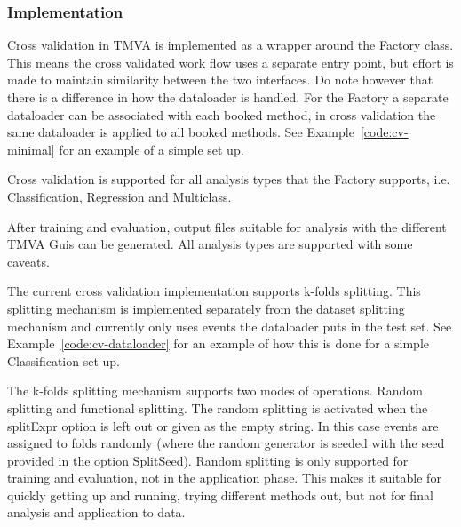 \subsubsection{Implementation}



Cross validation in TMVA is implemented as a wrapper around the Factory class. This means the cross validated work flow uses a separate entry point, but effort is made to maintain similarity between the two interfaces. Do note however that there is a difference in how the dataloader is handled. For the Factory a separate dataloader can be associated with each booked method, in cross validation the same dataloader is applied to all booked methods. See Example~\ref{code:cv-minimal} for an example of a simple set up.

Cross validation is supported for all analysis types that the Factory supports, i.e. Classification, Regression and Multiclass.

After training and evaluation, output files suitable for analysis with the different TMVA Guis can be generated. All analysis types are supported with some caveats.

The current cross validation implementation supports k-folds splitting. This splitting mechanism is implemented separately from the dataset splitting mechanism and currently only uses events the dataloader puts in the test set. See Example~\ref{code:cv-dataloader} for an example of how this is done for a simple Classification set up.

The k-folds splitting mechanism supports two modes of operations. Random splitting and functional splitting. The random splitting is activated when the splitExpr option is left out or given as the empty string. In this case events are assigned to folds randomly (where the random generator is seeded with the seed provided in the option SplitSeed). Random splitting is only supported for training and evaluation, not in the application phase. This makes it suitable for quickly getting up and running, trying different methods out, but not for final analysis and application to data.

